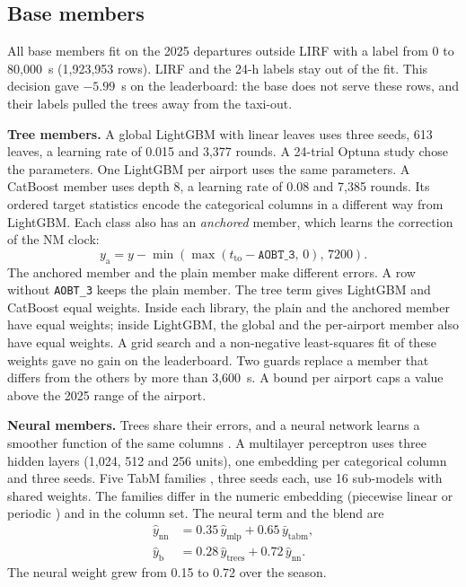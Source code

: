 \documentclass[
  manuscript=article,
  layout=preprint,
  year=2026,
  volume=x,
]{extra/joas}
\begin{document}
\subsection{Base members}

All base members fit on the 2025 departures outside LIRF with a label from 0 to 80,000~s (1,923,953 rows). LIRF and the 24-h labels stay out of the fit. This decision gave $-5.99$~s on the leaderboard: the base does not serve these rows, and their labels pulled the trees away from the taxi-out.

\textbf{Tree members.} A global LightGBM \cite{ke2017lightgbm} with linear leaves \cite{shi2019gradient} uses three seeds, 613 leaves, a learning rate of 0.015 and 3,377 rounds. A 24-trial Optuna study \cite{akiba2019optuna} chose the parameters. One LightGBM per airport uses the same parameters. A CatBoost member \cite{prokhorenkova2018catboost} uses depth 8, a learning rate of 0.08 and 7,385 rounds. Its ordered target statistics encode the categorical columns in a different way from LightGBM. Each class also has an \emph{anchored} member, which learns the correction of the NM clock:
\begin{equation}
\label{eq:anchor}
y_{\mathrm{a}} = y - \min\!\left(\max\!\left(t_{\mathrm{to}} - \texttt{AOBT\_3},\, 0\right),\, 7200\right).
\end{equation}
The anchored member and the plain member make different errors. A row without \texttt{AOBT\_3} keeps the plain member. The tree term gives LightGBM and CatBoost equal weights. Inside each library, the plain and the anchored member have equal weights; inside LightGBM, the global and the per-airport member also have equal weights. A grid search and a non-negative least-squares fit of these weights gave no gain on the leaderboard. Two guards replace a member that differs from the others by more than 3,600~s. A bound per airport caps a value above the 2025 range of the airport.

\textbf{Neural members.} Trees share their errors, and a neural network learns a smoother function of the same columns \cite{grinsztajn2022tree}. A multilayer perceptron uses three hidden layers (1,024, 512 and 256 units), one embedding per categorical column and three seeds. Five TabM families \cite{gorishniy2025tabm}, three seeds each, use 16 sub-models with shared weights. The families differ in the numeric embedding (piecewise linear or periodic \cite{gorishniy2022embeddings}) and in the column set. The neural term and the blend are
\begin{align}
\hat{y}_{\mathrm{nn}} &= 0.35\, \hat{y}_{\mathrm{mlp}} + 0.65\, \bar{y}_{\mathrm{tabm}}, \label{eq:nn}\\
\hat{y}_{\mathrm{b}} &= 0.28\, \hat{y}_{\mathrm{trees}} + 0.72\, \hat{y}_{\mathrm{nn}}. \label{eq:blend}
\end{align}
The neural weight grew from 0.15 to 0.72 over the season.
\end{document}
